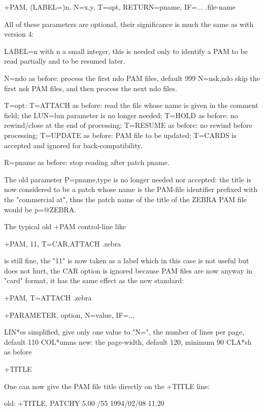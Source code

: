 \item
+PAM, (LABEL=)n, N=x,y, T=opt, RETURN=pname, IF=...   .file-name

All of these parameters are optional, their significance is much
the same as with version 4:

      LABEL=n    with n a small integer, this is needed only to identify
                 a PAM to be read partially and to be resumed later.

      N=ndo      as before: process the first ndo PAM files, default 999
      N=nsk,ndo  skip the first nsk PAM files, and then process
                 the next ndo files.

      T=opt:
      T=ATTACH   as before: read the file whose name is given in the
                 comment field; the LUN=lun parameter is no longer needed;
      T=HOLD     as before: no rewind/close at the end of processing;
      T=RESUME   as before: no rewind before processing;
      T=UPDATE   as before: PAM file to be updated;
      T=CARDS    is accepted and ignored for back-compatibility.

      R=pname    as before: stop reading after patch pname.

The old parameter P=pname,type is no longer needed nor accepted:
the title is now considered to be a patch whose name is the PAM-file
identifier prefixed with the "commercial at", thus the patch name of
the title of the ZEBRA PAM file would be p=@ZEBRA.

The typical old +PAM control-line like

      +PAM, 11, T=CAR,ATTACH   .zebra

is still fine, the "11" is now taken as a label which in this case
is not useful but does not hurt, the CAR option is ignored because
PAM files are now anyway in "card" format, it has the same effect as
the new standard:

      +PAM, T=ATTACH .zebra

\item
+PARAMETER, option, N=value, IF=...

      LIN*es     simplified, give only one value to "N=",
                 the number of lines per page, default 110
      COL*umns   new: the page-width, default 120, minimum 90
      CLA*sh     as before


\item
+TITLE

One can now give the PAM file title directly on the +TITLE line:

   old:
          +TITLE.
          PATCHY   5.00 /55  1994/02/08 11.20

